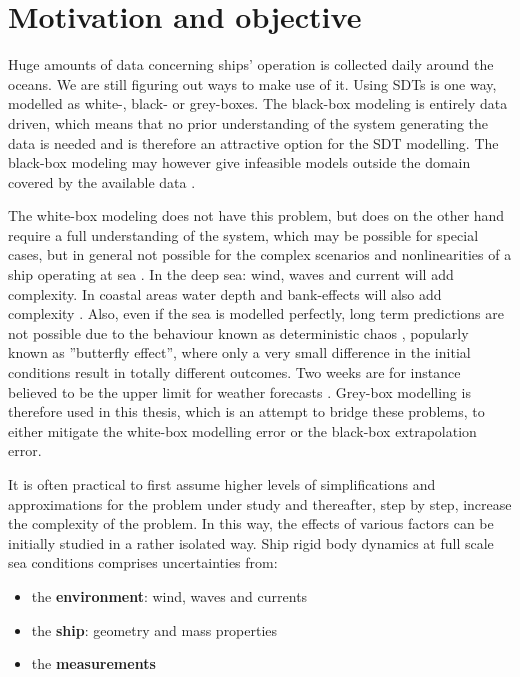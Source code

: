 \section{Motivation and objective}
\label{sec:motivation}
Huge amounts of data concerning ships' operation is collected daily around the oceans. We are still figuring out ways to make use of it. Using SDTs is one way, modelled as white-, black- or grey-boxes.
The black-box modeling is entirely data driven, which means that no prior understanding of the system generating the data is needed and is therefore an attractive option for the SDT modelling. The black-box modeling may however give infeasible models outside the domain covered by the available data \cite{nielsen_machine_2022}. 

The white-box modeling does not have this problem, but does on the other hand require a full understanding of the system, which may be possible for special cases, but in general not possible for the complex scenarios and nonlinearities of a ship operating at sea \cite{miller_ship_2021}. 
In the deep sea: wind, waves and current will add complexity. In coastal areas water depth and bank-effects will also add complexity \cite{nielsen_machine_2022}. 
Also, even if the sea is modelled perfectly, long term predictions are not possible due to the behaviour known as deterministic chaos \cite{lorenz_deterministic_1963}, popularly known as ''butterfly effect'', where only a very small difference in the initial conditions result in totally different outcomes. Two weeks are for instance believed to be the upper limit for weather forecasts  \cite{zhang_what_2019}. Grey-box modelling is therefore used in this thesis, which is an attempt to bridge these problems, to either mitigate the white-box modelling error or the black-box extrapolation error. 

It is often practical to first assume higher levels of simplifications and approximations for the problem under study and thereafter, step by step, increase the complexity of the problem. In this way, the effects of various factors can be initially studied in a rather isolated way. 
Ship rigid body dynamics at full scale sea conditions comprises uncertainties from:
\begin{itemize}
    \item the \textbf{environment}: wind, waves and currents
    \item the \textbf{ship}: geometry and mass properties
    \item the \textbf{measurements}
\end{itemize}

